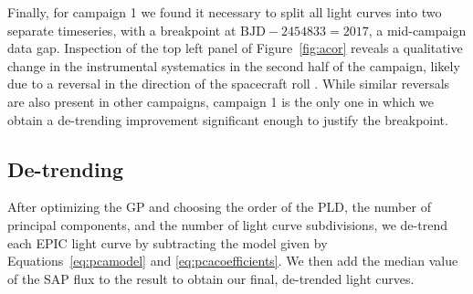 \documentclass[]{emulateapj}
\begin{document}
Finally, for campaign 1 we found it necessary to split all light curves into two separate
timeseries, with a breakpoint at $\mathrm{BJD} - 2454833 = 2017$, a mid-campaign data gap. 
Inspection of the top
left panel of Figure~\ref{fig:acor} reveals a qualitative change in the instrumental
systematics in the second half of the campaign, likely due to a reversal in the direction
of the spacecraft roll \citep[see, e.g.,][]{AIG16}. While similar reversals are also present 
in other campaigns, campaign 1 is the only one in which we obtain a de-trending improvement 
significant enough to justify the breakpoint. 


\subsection{De-trending}
After optimizing the GP and choosing the order of the PLD, the number of principal components, and the 
number of light curve subdivisions, we de-trend each EPIC light curve by subtracting the
model given by
Equations~\ref{eq:pcamodel} and \ref{eq:pcacoefficients}. We then add the median value of the
SAP flux to the result to obtain our final, de-trended light curves.
\end{document}
